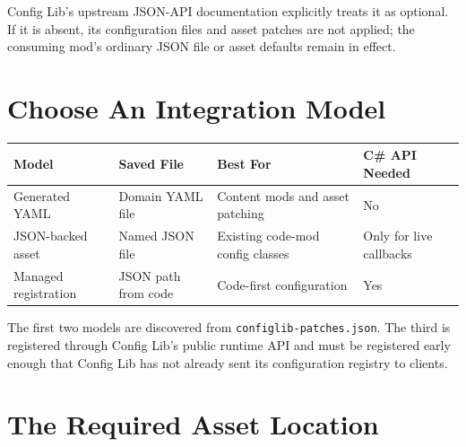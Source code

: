 \documentclass[
  11pt,
  letterpaper,
  titlepage]{article}
\newcounter{none} %
\begin{document}
Config Lib's upstream JSON-API documentation explicitly treats it as
optional. If it is absent, its configuration files and asset patches are
not applied; the consuming mod's ordinary JSON file or asset defaults
remain in effect.

\section{Choose An Integration Model}\label{choose-an-integration-model}

{\def\LTcaptype{none} %
\begin{longtable}[]{@{}
  >{\raggedright\arraybackslash}p{}
  >{\raggedright\arraybackslash}p{}
  >{\raggedright\arraybackslash}p{}
  >{\raggedright\arraybackslash}p{}@{}}
\toprule\noalign{}
\begin{minipage}[b]{\linewidth}\raggedright
Model
\end{minipage} & \begin{minipage}[b]{\linewidth}\raggedright
Saved File
\end{minipage} & \begin{minipage}[b]{\linewidth}\raggedright
Best For
\end{minipage} & \begin{minipage}[b]{\linewidth}\raggedright
C\# API Needed
\end{minipage} \\
\midrule\noalign{}
\endhead
\bottomrule\noalign{}
\endlastfoot
Generated YAML & Domain YAML file & Content mods and asset patching &
No \\
JSON-backed asset & Named JSON file & Existing code-mod config classes &
Only for live callbacks \\
Managed registration & JSON path from code & Code-first configuration &
Yes \\
\end{longtable}
}

The first two models are discovered from
\texttt{configlib-patches.json}. The third is registered through Config
Lib's public runtime API and must be registered early enough that Config
Lib has not already sent its configuration registry to clients.

\section{The Required Asset Location}\label{the-required-asset-location}
\end{document}
